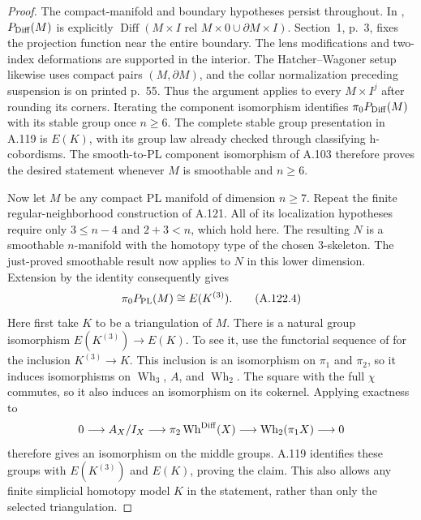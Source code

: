 \begin{proof}
The compact-manifold and boundary hypotheses persist throughout.
In \cite[Introduction, p.~1]{Igusa2021SecondObstructionI},
$P_{\rm Diff}(M)$ is explicitly
$\operatorname{Diff}(M\times I\text{ rel }M\times0\cup
\partial M\times I)$. Section~1, p.~3, fixes the projection
function near the entire boundary. The lens modifications and
two-index deformations are supported in the interior. The
Hatcher--Wagoner setup likewise uses compact pairs $(M,\partial M)$,
and the collar normalization preceding suspension is on printed
p.~55. Thus the argument applies to every $M\times I^j$ after
rounding its corners. Iterating the component isomorphism
identifies $\pi_0P_{\rm Diff}(M)$ with its stable group once
$n\geq6$. The complete stable group presentation in A.119 is
$E(K)$, with its group law already checked through classifying
h-cobordisms. The smooth-to-PL component isomorphism of A.103
therefore proves the desired statement whenever $M$ is smoothable
and $n\geq6$.

Now let $M$ be any compact PL manifold of dimension $n\geq7$.
Repeat the finite regular-neighborhood construction of A.121.
All of its localization hypotheses require only $3\leq n-4$ and
$2+3<n$, which hold here. The resulting $N$ is a smoothable
$n$-manifold with the homotopy type of the chosen $3$-skeleton.
The just-proved smoothable result now applies to $N$ in this lower
dimension. Extension by the identity consequently gives
\[
                 \pi_0P_{\rm PL}(M)\cong E(K^{(3)}).
                                                               \tag{A.122.4}
\]
Here first take $K$ to be a triangulation of $M$.
There is a natural group isomorphism
$E(K^{(3)})\longrightarrow E(K)$. To see it, use the functorial
sequence of \cite[Corollary~2.7]{Jahren2010} for the inclusion
$K^{(3)}\longrightarrow K$. This inclusion is an isomorphism on
$\pi_1$ and $\pi_2$, so it induces isomorphisms on
$\operatorname{Wh}_3$, $A$, and $\operatorname{Wh}_2$.
The square with the full $\chi$ commutes, so it also induces an
isomorphism on its cokernel. Applying exactness to
\[
 0\longrightarrow A_X/I_X\longrightarrow
 \pi_2\operatorname{Wh}^{\rm Diff}(X)\longrightarrow
 \operatorname{Wh}_2(\pi_1X)\longrightarrow0
\]
therefore gives an isomorphism on the middle groups. A.119 identifies
these groups with $E(K^{(3)})$ and $E(K)$, proving the claim.
This also allows any finite simplicial homotopy model $K$ in the
statement, rather than only the selected triangulation.


\end{proof}
